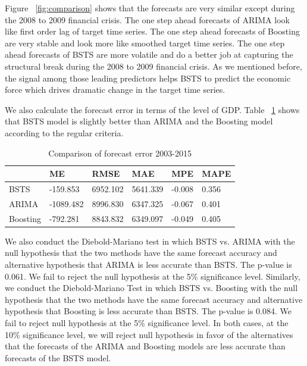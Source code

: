 Figure ~\ref{fig:comparison} shows that the forecasts are very similar except during the 2008 to 2009 financial crisis. The one step ahead forecasts of ARIMA look like first order lag of target time series. The one step ahead forecasts of Boosting are very stable and look more like smoothed target time series. The one step ahead forecasts of BSTS are more volatile and do a  better job at capturing the  structural break during the 2008 to 2009 financial crisis. As we mentioned before, the signal among those leading predictors helps BSTS to predict the economic force which drives dramatic change in the target time series. 

We also calculate the forecast error in terms of the level of GDP. Table ~\ref{ErrorCom} shows that BSTS model is slightly better than  ARIMA and the Boosting model according to the regular criteria. 


\begin{table}[h]
	\centering
	\begin{tabular}{@{}llllll@{}}
		\toprule
					  & ME   & RMSE    & MAE     & MPE     & MAPE     \\ \midrule
		BSTS         & -159.853 & 6952.102 & 5641.339 & -0.008 & 0.356 \\
		ARIMA         & -1089.482 & 8996.830 & 6347.325 & -0.067 & 0.401  \\ 
		Boosting      & -792.281 &  8843.832 &  6349.097 &  -0.049 &  0.405\\ \bottomrule
	\end{tabular}
	\caption{Comparison of forecast error 2003-2015}
	\label{ErrorCom}
\end{table}

We also conduct the Diebold-Mariano test in which BSTS vs. ARIMA with the null hypothesis that the two methods have the same forecast accuracy and alternative hypothesis that ARIMA is less accurate than BSTS. The p-value is 0.061. We fail to reject the null hypothesis at the 5\% significance level. Similarly, we conduct the Diebold-Mariano Test in which BSTS vs. Boosting with the null hypothesis that the two methods have the same forecast accuracy and alternative hypothesis that Boosting is less accurate than BSTS. The p-value is 0.084. We fail to reject null hypothesis at the  5\%  significance level. In both cases, at the 10\% significance level, we will reject null hypothesis in favor of the alternatives that the forecasts of the ARIMA and Boosting models are  less accurate than forecasts of the BSTS model.


